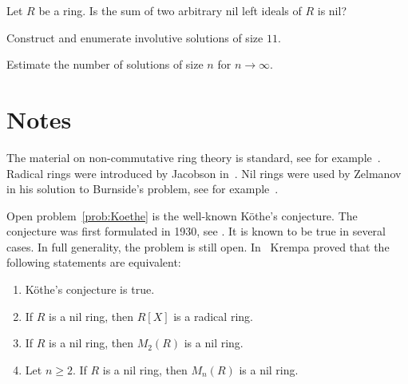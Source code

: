 


\begin{problem}[K\"othe]
\label{prob:Koethe}
Let $R$ be a ring. Is the sum 
of two arbitrary nil left ideals of $R$ is nil?
\end{problem}

\begin{problem}
Construct and enumerate involutive solutions of size $11$. 
\end{problem}

\begin{problem}
Estimate the number of solutions of size $n$ for $n\to\infty$. 
\end{problem}

\section*{Notes}

The material on non-commutative ring theory is standard, see for example~\cite{MR3308118}.
Radical rings were introduced by Jacobson in~\cite{MR12271}. Nil rings were
used by Zelmanov in his solution to Burnside's problem, see for example~\cite{MR1199575}. 

Open problem~\ref{prob:Koethe} is the well-known K\"othe's conjecture. 
The conjecture was first formulated in 1930, see \cite{MR1545158}. It is known to be true
in several cases. In full generality, the problem is still open. In~\cite{MR306251} 
Krempa proved that
the following statements are equivalent:
\begin{enumerate}
    \item K\"othe's conjecture is true.  
    \item If $R$ is a nil ring, then $R[X]$ is a radical ring. 
    \item If $R$ is a nil ring, then $M_2(R)$ is a nil ring. 
    \item Let $n\geq2$. If $R$ is a nil ring, then $M_n(R)$ is a nil ring. 
\end{enumerate}

